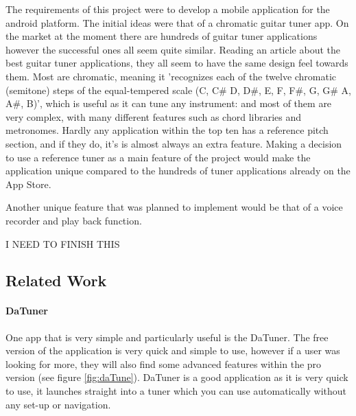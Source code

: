 \documentclass[conference]{acmsiggraph}
\begin{document}
The requirements of this project were to develop a mobile application for the android platform. The initial ideas were that of a chromatic guitar tuner app. On the market at the moment there are hundreds of guitar tuner applications however the successful ones all seem quite similar. Reading an article about the best guitar tuner applications, they all seem to have the same design feel towards them. \cite{bestApps} Most are chromatic, meaning it 'recognizes each of the twelve chromatic (semitone) steps of the equal-tempered scale (C, C\# D, D\#, E, F, F\#, G, G\# A, A\#, B)', \cite{Roland} which is useful as it can tune any instrument: and most of them are very complex, with many different features such as chord libraries and metronomes. Hardly any application within the top ten has a reference pitch section, and if they do, it's is almost always an extra feature. Making a decision to use a reference tuner as a main feature of the project would make the application unique compared to the hundreds of tuner applications already on the App Store.

Another unique feature that was planned to implement would be that of a voice recorder and play back function.

I NEED TO FINISH THIS


\subsection{Related Work}

\paragraph{DaTuner} One app that is very simple and particularly useful is the DaTuner. The free version of the application is very quick and simple to use, however if a user was looking for more, they will also find some advanced features within the pro version (see figure \ref{fig:daTune}). DaTuner is a good application as it is very quick to use, it launches straight into a tuner which you can use automatically without any set-up or navigation.
\end{document}
